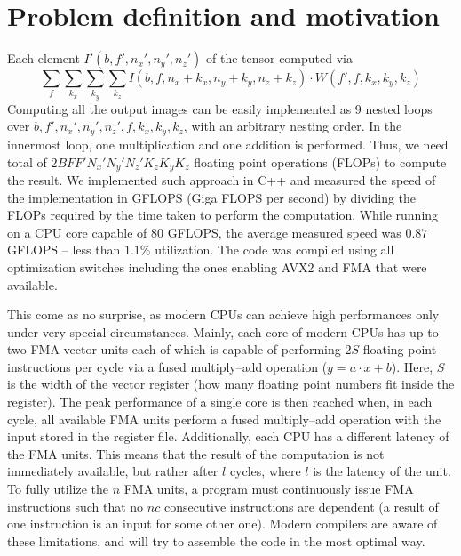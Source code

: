 \section{Problem definition and motivation}

  Each element $I'(b,f',n_x',n_y',n_z')$ of the tensor computed via
  {\footnotesize
  \begin{equation}
  \sum_{f} \sum_{k_x} \sum_{k_y} \sum_{k_z}
  I(b,f,n_x+k_x,n_y+k_y,n_z+k_z) \cdot W(f',f,k_x,k_y,k_z)
  \label{eqn:forward}
  \end{equation}
  } Computing all the output images can be easily implemented as 9
  nested loops over $b,f',n_x',n_y',n_z',f,k_x,k_y,k_z$, with an
  arbitrary nesting order.  In the innermost loop, one multiplication
  and one addition is performed.  Thus, we need total of
  $2BFF'N_x'N_y'N_z'K_zK_yK_z$ floating point operations (FLOPs) to
  compute the result.  We implemented such approach in C++ and
  measured the speed of the implementation in GFLOPS (Giga FLOPS per
  second) by dividing the FLOPs required by the time taken to perform
  the computation.  While running on a CPU core capable of $80$
  GFLOPS, the average measured speed was $0.87$ GFLOPS -- less than
  $1.1\%$ utilization.  The code was compiled using all optimization
  switches including the ones enabling AVX2 and FMA that were
  available.

  This come as no surprise, as modern CPUs can achieve high
  performances only under very special circumstances.  Mainly, each
  core of modern CPUs has up to two FMA vector units each of which is
  capable of performing $2S$ floating point instructions per cycle via
  a fused multiply--add operation ($y = a\cdot x + b$).  Here, $S$ is
  the width of the vector register (how many floating point numbers
  fit inside the register).  The peak performance of a single core is
  then reached when, in each cycle, all available FMA units perform a
  fused multiply--add operation with the input stored in the register
  file.  Additionally, each CPU has a different latency of the FMA
  units.  This means that the result of the computation is not
  immediately available, but rather after $l$ cycles, where $l$ is the
  latency of the unit.  To fully utilize the $n$ FMA units, a program
  must continuously issue FMA instructions such that no $nc$
  consecutive instructions are dependent (a result of one instruction
  is an input for some other one).  Modern compilers are aware of
  these limitations, and will try to assemble the code in the most
  optimal way.

